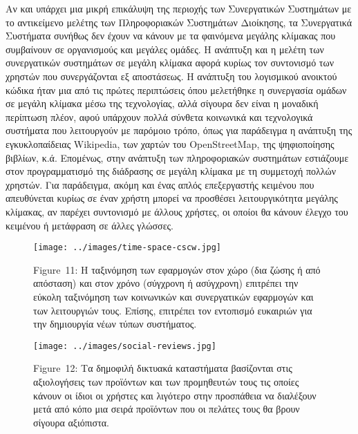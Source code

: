 \documentclass[
]{article}
\begin{document}
Αν και υπάρχει μια μικρή επικάλυψη της περιοχής των Συνεργατικών
Συστημάτων με το αντικείμενο μελέτης των Πληροφοριακών Συστημάτων
Διοίκησης, τα Συνεργατικά Συστήματα συνήθως δεν έχουν να κάνουν με τα
φαινόμενα μεγάλης κλίμακας που συμβαίνουν σε οργανισμούς και μεγάλες
ομάδες. Η ανάπτυξη και η μελέτη των συνεργατικών συστημάτων σε μεγάλη
κλίμακα αφορά κυρίως τον συντονισμό των χρηστών που συνεργάζονται εξ
αποστάσεως. Η ανάπτυξη του λογισμικού ανοικτού κώδικα ήταν μια από τις
πρώτες περιπτώσεις όπου μελετήθηκε η συνεργασία ομάδων σε μεγάλη κλίμακα
μέσω της τεχνολογίας, αλλά σίγουρα δεν είναι η μοναδική περίπτωση πλέον,
αφού υπάρχουν πολλά σύνθετα κοινωνικά και τεχνολογικά συστήματα που
λειτουργούν με παρόμοιο τρόπο, όπως για παράδειγμα η ανάπτυξη της
εγκυκλοπαίδειας Wikipedia, των χαρτών του OpenStreetMap, της
ψηφιοποίησης βιβλίων, κ.ά. Επομένως, στην ανάπτυξη των πληροφοριακών
συστημάτων εστιάζουμε στον προγραμματισμό της διάδρασης σε μεγάλη
κλίμακα με τη συμμετοχή πολλών χρηστών. Για παράδειγμα, ακόμη και ένας
απλός επεξεργαστής κειμένου που απευθύνεται κυρίως σε έναν χρήστη μπορεί
να προσθέσει λειτουργικότητα μεγάλης κλίμακας, αν παρέχει συντονισμό με
άλλους χρήστες, οι οποίοι θα κάνουν έλεγχο του κειμένου ή μετάφραση σε
άλλες γλώσσες.

\leavevmode{}%
\begin{figure}
\hypertarget{fig:time-space-cscw}{%
\centering
\texttt{[image: ../images/time-space-cscw.jpg]}
\caption{Figure~11: Η ταξινόμηση των εφαρμογών στον χώρο (δια ζώσης ή
από απόσταση) και στον χρόνο (σύγχρονη ή ασύγχρονη) επιτρέπει την εύκολη
ταξινόμηση των κοινωνικών και συνεργατικών εφαρμογών και των λειτουργιών
τους. Επίσης, επιτρέπει τον εντοπισμό ευκαιριών για την δημιουργία νέων
τύπων συστήματος.}\label{fig:time-space-cscw}
}
\end{figure}

\leavevmode{}%
\begin{figure}
\hypertarget{fig:social-reviews}{%
\centering
\texttt{[image: ../images/social-reviews.jpg]}
\caption{Figure~12: Τα δημοφιλή δικτυακά καταστήματα βασίζονται στις
αξιολογήσεις των προϊόντων και των προμηθευτών τους τις οποίες κάνουν οι
ίδιοι οι χρήστες και λιγότερο στην προσπάθεια να διαλέξουν μετά από κόπο
μια σειρά προϊόντων που οι πελάτες τους θα βρουν σίγουρα
αξιόπιστα.}\label{fig:social-reviews}
}
\end{figure}
\end{document}

